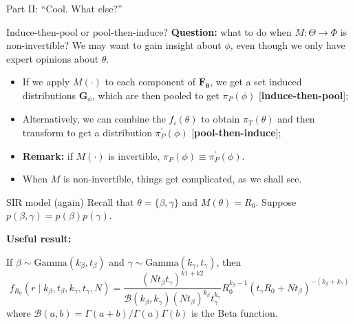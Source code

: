 \begin{frame}{}
\begin{center}
 {\Huge Part II: ``Cool. What else?''}
\end{center} 
\end{frame}
\begin{frame}{Induce-then-pool or pool-then-induce?}
\textbf{Question:} what to do when $M : \Theta \to \Phi$ is non-invertible?
We may want to gain insight about $\phi$, even though we only have expert opinions about $\theta$.
\begin{itemize}
 \item[\ding{212}] If we apply $M(\cdot)$ to each component of $\mathbf{F_\theta}$, we get a set induced distributions $\boldsymbol G_\phi$, which are then pooled to get $\pi_P(\phi)$ [\textbf{induce-then-pool}];\pause
 \item[\ding{212}] Alternatively, we can combine the $f_i(\theta)$ to obtain $\pi_T(\theta)$ and then transform to get a distribution $\pi_P^\prime(\phi)$ [\textbf{pool-then-induce}];\pause
 \item \textbf{Remark:} if $M(\cdot)$ is invertible, $\pi_P(\phi) \equiv \pi_P^\prime(\phi)$. \pause
 \item When $M$ is non-invertible, things get complicated, as we shall see.
\end{itemize}
\end{frame}
\begin{frame}{SIR model (again)}
Recall that $\theta = \{\beta, \gamma \}$ and $M(\theta) = R_0$.
Suppose $p(\beta, \gamma) = p(\beta)p(\gamma)$.
\begin{center}
 \textbf{Useful result:}
\end{center}
If $\beta \sim \text{Gamma}(k_\beta, t_\beta)$ and $\gamma \sim \text{Gamma}(k_\gamma, t_\gamma)$, then 
\begin{equation*}
\label{eq:density}
f_{R_0}(r \mid k_{\beta}, t_{\beta},  k_{\gamma}, t_{\gamma}, N ) =  \frac{(Nt_{\beta}t_{\gamma})^{k1+k2}}{\mathcal{B}(k_{\beta}, k_{\gamma})(Nt_{\beta})^{k_{\beta}}t_{\gamma}^{k_{\gamma}} } R_0^{k_{\beta}-1} (t_{\gamma} R_0 + Nt_{\beta})^{-(k_{\beta} + k_{\gamma})}
\end{equation*}
where $\mathcal{B}(a, b) = \Gamma(a + b)/\Gamma(a)\Gamma(b)$ is the Beta function.
\end{frame}
